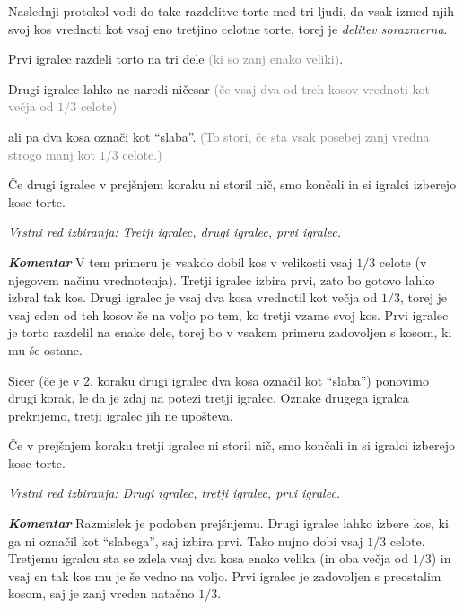 \documentclass[a4paper,12pt]{article}
\begin{document}
Naslednji protokol vodi do take razdelitve torte med tri ljudi, da vsak izmed njih svoj kos vrednoti kot vsaj eno tretjino celotne torte, torej je {\em delitev sorazmerna}.


\begin{protokol}

\item Prvi igralec razdeli torto na tri dele \textcolor{gray}{(ki so zanj enako veliki)}.

\item Drugi igralec lahko ne naredi ničesar \textcolor{gray}{(če vsaj dva od treh kosov vrednoti kot večja od $1/3$ celote)}

ali pa dva kosa označi kot ``slaba''. \textcolor{gray}{(To stori, če sta vsak posebej zanj vredna strogo manj kot $1/3$ celote.)}

\item Če drugi igralec v prejšnjem koraku ni storil nič, smo končali in si igralci izberejo kose torte.

\textsl{Vrstni red izbiranja: Tretji igralec, drugi igralec, prvi igralec.}

\item [\textbf { \em Komentar}] V tem primeru je vsakdo dobil kos v velikosti vsaj  $1/3$ celote (v njegovem načinu vrednotenja). Tretji igralec izbira prvi, zato bo gotovo lahko izbral tak kos. Drugi igralec je vsaj dva kosa vrednotil kot večja od  $1/3$, torej je vsaj eden od teh kosov še na voljo po tem, ko tretji vzame svoj kos. Prvi igralec je torto razdelil na enake dele, torej bo v vsakem primeru zadovoljen s kosom, ki mu še ostane.

\item Sicer (če je v 2. koraku drugi igralec dva kosa označil kot ``slaba'') ponovimo drugi korak, le da je zdaj na potezi tretji igralec. Oznake drugega igralca prekrijemo, tretji igralec jih ne upošteva.

\item Če v prejšnjem koraku tretji igralec ni storil nič, smo končali in si igralci izberejo kose torte.

\textsl{Vrstni red izbiranja: Drugi igralec, tretji igralec, prvi igralec.}

\item [\textbf{\em Komentar}] Razmislek je podoben prejšnjemu. Drugi igralec lahko izbere kos, ki ga ni označil kot ``slabega'', saj izbira prvi. Tako nujno dobi vsaj $1/3$ celote. Tretjemu igralcu sta se zdela vsaj dva kosa enako velika (in oba večja od $1/3$) in vsaj en tak kos mu je še vedno na voljo. Prvi igralec je zadovoljen s preostalim kosom, saj je zanj vreden natačno $1/3$.


\end{protokol}
\end{document}
